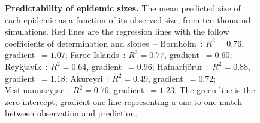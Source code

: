 \documentclass[10pt]{article}
\begin{document}
\begin{figure}[!h]
\centering
\caption{\textbf{Predictability of epidemic sizes.} The mean predicted size of each epidemic as a function of its observed size, from ten thousand simulations. Red lines are the regression lines with the follow coefficients of determination and slopes~-- Bornholm~: $R^2=0.76$, gradient~$=1.07$; Faroe Islands~: $R^2=0.77$, gradient~$=0.60$; Reykjav\'{i}k~: $R^2=0.64$, gradient~$=0.96$; Hafnarfj\"{o}r\dh{}ur~: $R^2=0.88$, gradient~$=1.18$; Akureyri~: $R^2 = 0.49$, gradient~$=0.72$; Vestmannaeyjar~: $R^2=0.76$, gradient~$=1.23$. The green line is the zero-intercept, gradient-one line representing a one-to-one match between observation and prediction.}
\label{fig_sizes}
\end{figure}
\end{document}

